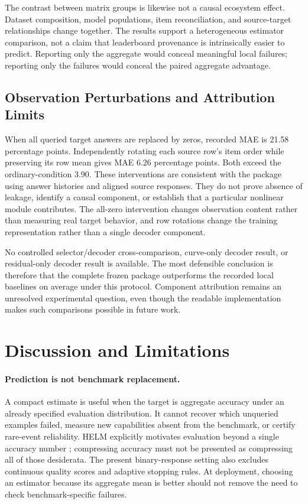 \documentclass{article}
\begin{document}
The contrast between matrix groups is likewise not a causal ecosystem effect. Dataset composition, model populations, item reconciliation, and source-target relationships change together. The results support a heterogeneous estimator comparison, not a claim that leaderboard provenance is intrinsically easier to predict. Reporting only the aggregate would conceal meaningful local failures; reporting only the failures would conceal the paired aggregate advantage.

\subsection{Observation Perturbations and Attribution Limits}
When all queried target answers are replaced by zeros, recorded MAE is 21.58 percentage points. Independently rotating each source row's item order while preserving its row mean gives MAE 6.26 percentage points. Both exceed the ordinary-condition 3.90. These interventions are consistent with the package using answer histories and aligned source responses. They do not prove absence of leakage, identify a causal component, or establish that a particular nonlinear module contributes. The all-zero intervention changes observation content rather than measuring real target behavior, and row rotations change the training representation rather than a single decoder component.

No controlled selector/decoder cross-comparison, curve-only decoder result, or residual-only decoder result is available. The most defensible conclusion is therefore that the complete frozen package outperforms the recorded local baselines on average under this protocol. Component attribution remains an unresolved experimental question, even though the readable implementation makes such comparisons possible in future work.

\section{Discussion and Limitations}
\paragraph{Prediction is not benchmark replacement.}
A compact estimate is useful when the target is aggregate accuracy under an already specified evaluation distribution. It cannot recover which unqueried examples failed, measure new capabilities absent from the benchmark, or certify rare-event reliability. HELM explicitly motivates evaluation beyond a single accuracy number \citep{Liang2023}; compressing accuracy must not be presented as compressing all of those desiderata. The present binary-response setting also excludes continuous quality scores and adaptive stopping rules. At deployment, choosing an estimator because its aggregate mean is better should not remove the need to check benchmark-specific failures.
\end{document}

